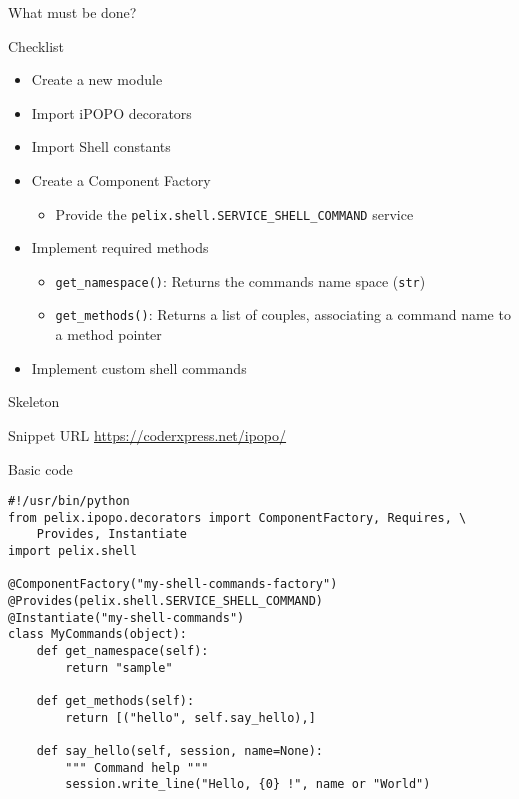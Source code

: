 \begin{frame}{What must be done?}
\begin{block}{Checklist}
\begin{itemize}
\item Create a new module
\item Import iPOPO decorators
\item Import Shell constants
\item Create a Component Factory
\begin{itemize}
\item Provide the \texttt{pelix.shell.SERVICE\_SHELL\_COMMAND} service
\end{itemize}
\item Implement required methods
\begin{itemize}
\item \texttt{get\_namespace()}: Returns the commands name space (\texttt{str})
\item \texttt{get\_methods()}: Returns a list of couples, associating a command name to a method pointer
\end{itemize}
\item Implement custom shell commands
\end{itemize}
\end{block}
\end{frame}

\begin{frame}[fragile]{Skeleton}
\begin{scriptsize}
\begin{exampleblock}{Snippet URL}
\url{https://coderxpress.net/ipopo/}
\end{exampleblock}

\begin{block}{Basic code}
\begin{verbatim}
#!/usr/bin/python
from pelix.ipopo.decorators import ComponentFactory, Requires, \
    Provides, Instantiate
import pelix.shell

@ComponentFactory("my-shell-commands-factory")
@Provides(pelix.shell.SERVICE_SHELL_COMMAND)
@Instantiate("my-shell-commands")
class MyCommands(object):
    def get_namespace(self):
        return "sample"

    def get_methods(self):
        return [("hello", self.say_hello),]

    def say_hello(self, session, name=None):
        """ Command help """
        session.write_line("Hello, {0} !", name or "World")
\end{verbatim}
\end{block}
\end{scriptsize}
\end{frame}
